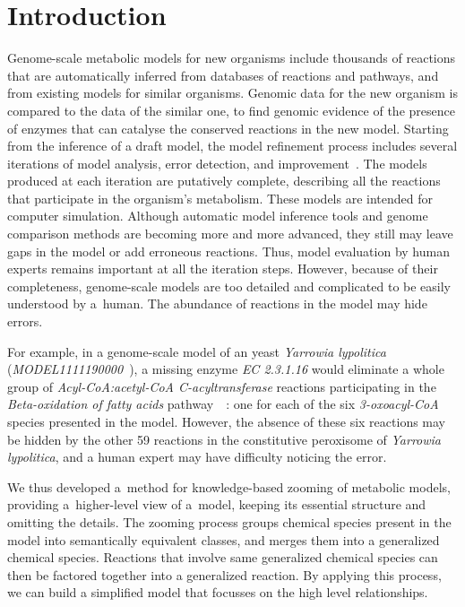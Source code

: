 \documentclass[10pt]{bmc_article}
\newenvironment{bmcformat}{\baselineskip20pt\sloppy\setboolean{publ}{false}}{\baselineskip20pt\sloppy}
\begin{document}
\begin{bmcformat}
\section*{Introduction}
Genome-scale metabolic models for new organisms include thousands of reactions that are automatically inferred from databases of reactions and pathways, and from existing models for similar organisms. Genomic data for the new organism is compared to the data of the similar one, to find genomic evidence of the presence of enzymes that can catalyse the conserved reactions in the new model. Starting from the inference of a draft model, the model refinement process includes several iterations of model analysis, error detection, and improvement~\cite{Thiele2010}. The models produced at each iteration are putatively complete, describing all the reactions that participate in the organism's metabolism. These models are intended for computer simulation. Although automatic model inference tools and genome comparison methods are becoming more and more advanced, they still may leave gaps in the model or add erroneous reactions. Thus, model evaluation by human experts remains important at all the iteration steps. However, because of their completeness, genome-scale models are too detailed and complicated to be easily understood by a~human. The abundance of reactions in the model may hide errors.


For example, in a genome-scale model of an yeast \textit{Yarrowia lypolitica} (\emph{MODEL1111190000}~\cite{Loira12}), a missing enzyme \textit{EC 2.3.1.16} would eliminate a whole group of \textit{Acyl-CoA:acetyl-CoA C-acyltransferase} reactions participating in the \textit{Beta-oxidation of fatty acids} pathway~~\cite{Metzler01}: one for each of the six \textit{3-oxoacyl-CoA} species presented in the model. However, the absence of these six reactions may be hidden by the other 59 reactions in the constitutive peroxisome of \textit{Yarrowia lypolitica}, and a human expert may have difficulty noticing the error.


We thus developed a~method for knowledge-based zooming of metabolic models, providing a~higher-level view of a~model, keeping its essential structure and omitting the details. The zooming process groups chemical species present in the model into semantically equivalent classes, and merges them into a generalized chemical species. Reactions that involve same generalized chemical species can then be factored together into a generalized reaction. By applying this process, we can build a simplified model that focusses on the high level relationships. 


\end{bmcformat}
\end{document}
